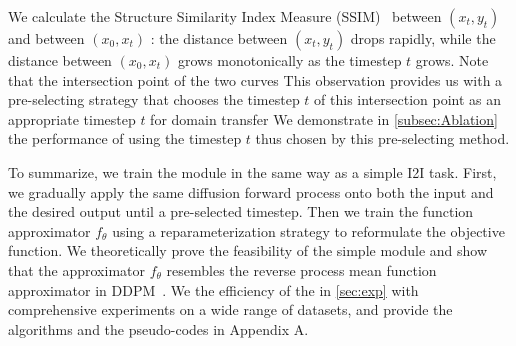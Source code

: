 %
We calculate the Structure Similarity Index Measure (SSIM)~\cite{wang2004image} between $(x_t,y_t)$ and between $(x_0, x_t)$
%
: the distance between $(x_t,y_t)$ drops rapidly, while the distance between $(x_0, x_t)$ grows monotonically as the timestep $t$ grows.
%
Note that the intersection point of the two curves  %
%
This observation provides us with a pre-selecting strategy that chooses the timestep $t$ of this intersection point as an appropriate timestep $t$ for domain transfer
%
We demonstrate in \cref{subsec:Ablation} the performance of using the timestep $t$ thus chosen by this pre-selecting method.

To summarize, we train the \method module in the same way as a simple I2I task.
%
First, we gradually apply the same diffusion forward process onto both the input  and the desired output until a pre-selected timestep.
%
Then\sqq{,} we train the function approximator $f_{\theta}$ using a reparameterization strategy to reformulate the objective function.
%
We theoretically prove the feasibility of the simple \method module and show that the approximator $f_{\theta}$ resembles the reverse process mean function approximator in DDPM~\cite{ho2020denoising}.
%
We  the efficiency of the \method in \cref{sec:exp} with comprehensive experiments on a wide range of datasets, and provide the algorithms and the pseudo-codes in Appendix A.





\subsection{}\label{subsec:generalization}


